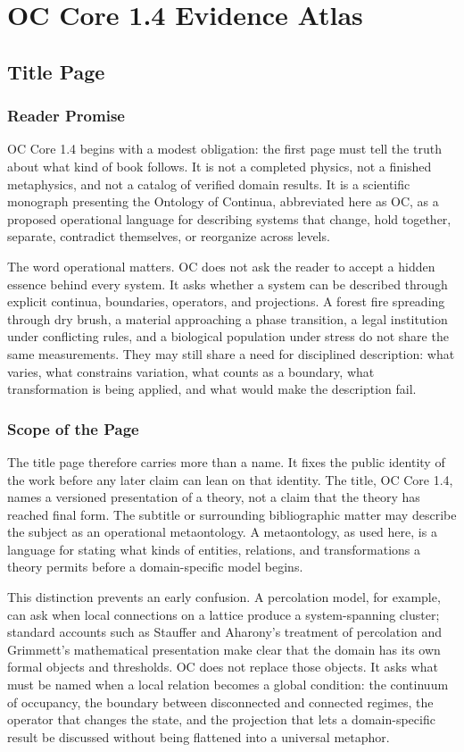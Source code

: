 \documentclass[11pt,a4paper,openany]{book}
\begin{document}
\chapter{OC Core 1.4 Evidence Atlas}
\section{Title Page}
\subsection{Reader Promise}
OC Core 1.4 begins with a modest obligation: the first page must tell the truth about what kind of book follows. It is not a completed physics, not a finished metaphysics, and not a catalog of verified domain results. It is a scientific monograph presenting the Ontology of Continua, abbreviated here as OC, as a proposed operational language for describing systems that change, hold together, separate, contradict themselves, or reorganize across levels. \cite{stauffer_percolation,grimmett_percolation}\par
The word operational matters. OC does not ask the reader to accept a hidden essence behind every system. It asks whether a system can be described through explicit continua, boundaries, operators, and projections. A forest fire spreading through dry brush, a material approaching a phase transition, a legal institution under conflicting rules, and a biological population under stress do not share the same measurements. They may still share a need for disciplined description: what varies, what constrains variation, what counts as a boundary, what transformation is being applied, and what would make the description fail.\par
\subsection{Scope of the Page}
The title page therefore carries more than a name. It fixes the public identity of the work before any later claim can lean on that identity. The title, OC Core 1.4, names a versioned presentation of a theory, not a claim that the theory has reached final form. The subtitle or surrounding bibliographic matter may describe the subject as an operational metaontology. A metaontology, as used here, is a language for stating what kinds of entities, relations, and transformations a theory permits before a domain-specific model begins. \cite{stauffer_percolation,grimmett_percolation}\par
This distinction prevents an early confusion. A percolation model, for example, can ask when local connections on a lattice produce a system-spanning cluster; standard accounts such as Stauffer and Aharony's treatment of percolation and Grimmett's mathematical presentation make clear that the domain has its own formal objects and thresholds. OC does not replace those objects. It asks what must be named when a local relation becomes a global condition: the continuum of occupancy, the boundary between disconnected and connected regimes, the operator that changes the state, and the projection that lets a domain-specific result be discussed without being flattened into a universal metaphor.\par
\end{document}
